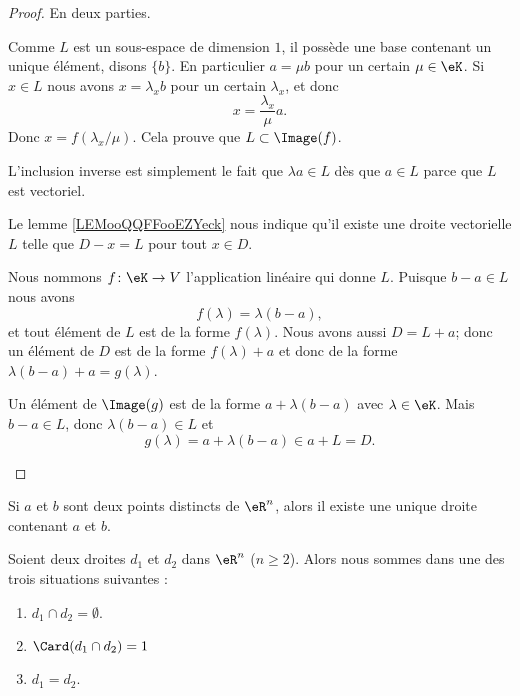 \begin{proof}
	En deux parties.
	\begin{subproof}
		Comme \( L\) est un sous-espace de dimension \( 1\), il possède une base contenant un unique élément, disons \( \{ b \}\). En particulier \( a=\mu b\) pour un certain \( \mu\in \eK\). Si \( x\in L\) nous avons \( x=\lambda_x b\) pour un certain \( \lambda_x\), et donc
		\begin{equation}
			x=\frac{ \lambda_x }{ \mu }a.
		\end{equation}
		Donc \( x=f(\lambda_x/\mu)\). Cela prouve que \( L\subset\Image(f)\).

		L'inclusion inverse est simplement le fait que \( \lambda a\in L\) dès que \( a\in L\) parce que \( L\) est vectoriel.

		Le lemme \ref{LEMooQQFFooEZYeck} nous indique qu'il existe une droite vectorielle \( L\) telle que \( D-x=L\) pour tout \( x\in D\).
		\begin{subproof}
			Nous nommons \( f\colon \eK\to V\) l'application linéaire qui donne \( L\). Puisque \( b-a\in L\) nous avons
			\begin{equation}
				f(\lambda)=\lambda(b-a),
			\end{equation}
			et tout élément de \( L\) est de la forme \( f(\lambda)\). Nous avons aussi \( D=L+a\); donc un élément de \( D\) est de la forme \( f(\lambda)+a\) et donc de la forme \( \lambda(b-a)+a=g(\lambda)\).

			Un élément de \( \Image(g)\) est de la forme \( a+\lambda(b-a)\) avec \( \lambda\in \eK\). Mais \( b-a\in L\), donc \( \lambda(b-a)\in L\) et
			\begin{equation}
				g(\lambda)=a+\lambda(b-a)\in a+L=D.
			\end{equation}
		\end{subproof}
	\end{subproof}
\end{proof}

\begin{proposition}     \label{PROPooRSKLooVrxrFz}
	Si \( a\) et \( b\) sont deux points distincts de \( \eR^n\), alors il existe une unique droite contenant \( a\) et \( b\).
\end{proposition}

\begin{proposition}     \label{PROPooTFTJooJejuBU}
	Soient deux droites \( d_1\) et \( d_2\) dans \( \eR^n\) (\( n\geq 2\)). Alors nous sommes dans une des trois situations suivantes :
	\begin{enumerate}
		\item
		      \( d_1\cap d_2=\emptyset\).
		\item
		      \( \Card(d_1\cap d_2)=1\)
		\item
		      \( d_1=d_2\).
	\end{enumerate}
\end{proposition}

